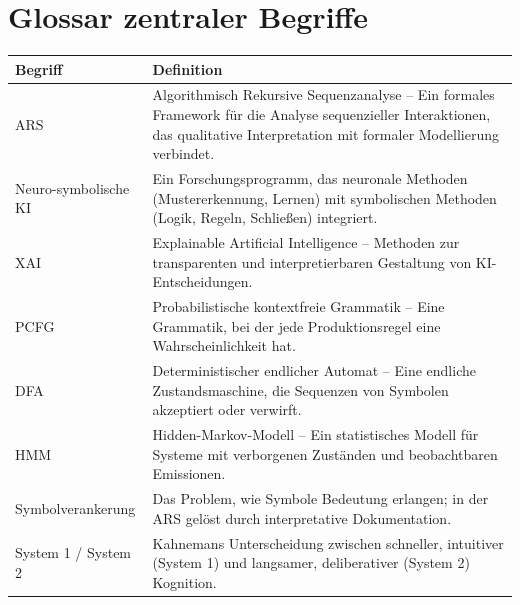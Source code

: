 \documentclass[12pt,a4paper]{article}
\begin{document}
\newpage
\appendix
\section{Glossar zentraler Begriffe}

\begin{longtable}{@{} p{3cm} p{10cm} @{}}
\toprule
\textbf{Begriff} & \textbf{Definition} \\
\midrule
ARS & Algorithmisch Rekursive Sequenzanalyse – Ein formales Framework für die 
Analyse sequenzieller Interaktionen, das qualitative Interpretation mit formaler 
Modellierung verbindet. \\
Neuro-symbolische KI & Ein Forschungsprogramm, das neuronale Methoden (Mustererkennung, 
Lernen) mit symbolischen Methoden (Logik, Regeln, Schließen) integriert. \\
XAI & Explainable Artificial Intelligence – Methoden zur transparenten und 
interpretierbaren Gestaltung von KI-Entscheidungen. \\
PCFG & Probabilistische kontextfreie Grammatik – Eine Grammatik, bei der jede 
Produktionsregel eine Wahrscheinlichkeit hat. \\
DFA & Deterministischer endlicher Automat – Eine endliche Zustandsmaschine, die 
Sequenzen von Symbolen akzeptiert oder verwirft. \\
HMM & Hidden-Markov-Modell – Ein statistisches Modell für Systeme mit verborgenen 
Zuständen und beobachtbaren Emissionen. \\
Symbolverankerung & Das Problem, wie Symbole Bedeutung erlangen; in der ARS gelöst 
durch interpretative Dokumentation. \\
System 1 / System 2 & Kahnemans Unterscheidung zwischen schneller, intuitiver 
(System 1) und langsamer, deliberativer (System 2) Kognition. \\
\bottomrule
\end{longtable}
\end{document}
